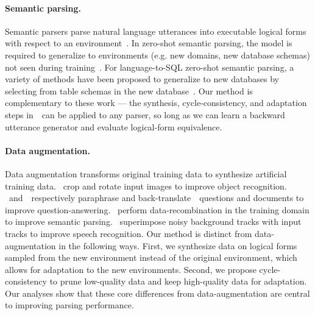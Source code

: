 \documentclass[11pt,a4paper]{article}
\begin{document}
\paragraph{Semantic parsing.}
Semantic parsers parse natural language utterances into executable logical forms with respect to an environment~\citep{zelle1996LearningTP,zettlemoyer2005LearningTM,Liang2011LearningDC}.
In zero-shot semantic parsing, the model is required to generalize to environments (e.g. new domains, new database schemas) not seen during training~\citep{pasupat2015compositional,zhong2017seq2sql,yu2018spider}.
For language-to-SQL zero-shot semantic parsing, a variety of methods have been proposed to generalize to new databases by selecting from table schemas in the new database~\citep{zhang2019editing,guo2019IRNet}.
Our method is complementary to these work --- the synthesis, cycle-consistency, and adaptation steps in~\modelnameshort~can be applied to any parser, so long as we can learn a backward utterance generator and evaluate logical-form equivalence.


\paragraph{Data augmentation.}
Data augmentation transforms original training data to synthesize artificial training data.
\citet{krizhevsky2017imagenet}~crop and rotate input images to improve object recognition.
\citet{dong2017learning}~and~\citet{yu2018qanet}~respectively paraphrase and back-translate~\citep{sennrich2016improving,edunov2018understanding}~questions and documents to improve question-answering.
\citet{jia2016data}~perform data-recombination in the training domain to improve semantic parsing.
\citet{hannun2014deepspeech}~superimpose noisy background tracks with input tracks to improve speech recognition.
Our method is distinct from data-augmentation in the following ways.
First, we synthesize data on logical forms sampled from the new environment instead of the original environment, which allows for adaptation to the new environments.
Second, we propose cycle-consistency to prune low-quality data and keep high-quality data for adaptation.
Our analyses show that these core differences from data-augmentation are central to improving parsing performance.
\end{document}
